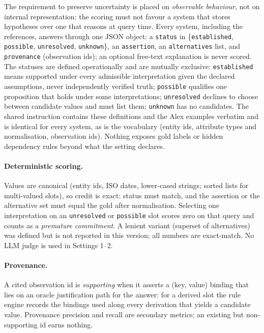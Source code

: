The requirement to preserve uncertainty is placed on \emph{observable behaviour}, not on internal representation: the scoring must not favour a system that stores hypotheses over one that reasons at query time. Every system, including the references, answers through one JSON object: a \texttt{status} in \{\texttt{established}, \texttt{possible}, \texttt{unresolved}, \texttt{unknown}\}, an \texttt{assertion}, an \texttt{alternatives} list, and \texttt{provenance} (observation ids); an optional free-text explanation is never scored. The statuses are defined operationally and are mutually exclusive: \texttt{established} means supported under every admissible interpretation given the declared assumptions, never independently verified truth; \texttt{possible} qualifies one proposition that holds under some interpretations; \texttt{unresolved} declines to choose between candidate values and must list them; \texttt{unknown} has no candidates. The shared instruction contains these definitions and the Alex examples verbatim and is identical for every system, as is the vocabulary (entity ids, attribute types and normalisation, observation ids). Nothing exposes gold labels or hidden dependency rules beyond what the setting declares.

\paragraph{Deterministic scoring.} Values are canonical (entity ids, ISO dates, lower-cased strings; sorted lists for multi-valued slots), so credit is exact: status must match, and the assertion or the alternative set must equal the gold after normalisation. Selecting one interpretation on an \texttt{unresolved} or \texttt{possible} slot scores zero on that query and counts as a \emph{premature commitment}. A lenient variant (superset of alternatives) was defined but is not reported in this version; all numbers are exact-match. No LLM judge is used in Settings 1--2.

\paragraph{Provenance.} A cited observation id is \emph{supporting} when it asserts a (key, value) binding that lies on an oracle justification path for the answer: for a derived slot the rule engine records the bindings used along every derivation that yields a candidate value. Provenance precision and recall are secondary metrics; an existing but non-supporting id earns nothing.

